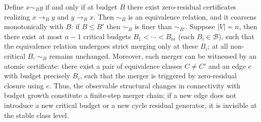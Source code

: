 \begin{conclusion}\label{con:xi-connectivity-hierarchy-finite-critical-budgets}
Define \(x\sim_B y\) if and only if at budget \(B\) there exist zero-residual certificates realizing \(x\to_B y\) and \(y\to_B x\).
Then \(\sim_B\) is an equivalence relation, and it coarsens monotonically with \(B\): if \(B\le B'\) then \(\sim_B\) is finer than \(\sim_{B'}\).
Suppose \(|V|=n\), then there exist at most \(n-1\) critical budgets
\(
B_1<\cdots<B_m
\)
(each \(B_i\in\mathcal{B}\)), such that the equivalence relation undergoes strict merging only at these \(B_i\); at all non-critical \(B\), \(\sim_B\) remains unchanged.
Moreover, each merger can be witnessed by an atomic certificate: there exist a pair of equivalence classes \(C\neq C'\) and an edge \(e\) with budget precisely \(B_i\), such that the merger is triggered by zero-residual closure using \(e\).
Thus, the observable structural changes in connectivity with budget growth constitute a finite-step merger chain; if a new edge does not introduce a new critical budget or a new cycle residual generator, it is invisible at the stable class level.
\end{conclusion}

